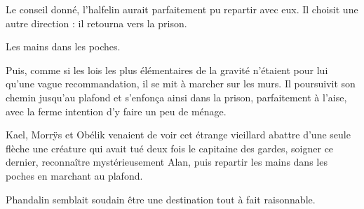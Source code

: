 Le conseil donné, l'halfelin aurait parfaitement pu repartir avec eux. Il choisit une autre direction : il retourna vers la prison.

Les mains dans les poches.

Puis, comme si les lois les plus élémentaires de la gravité n'étaient pour lui qu'une vague recommandation, il se mit à marcher sur les murs. Il poursuivit son chemin jusqu'au plafond et s'enfonça ainsi dans la prison, parfaitement à l'aise, avec la ferme intention d'y faire un peu de ménage.

Kael, Morrÿs et Obélik venaient de voir cet étrange vieillard abattre d'une seule flèche une créature qui avait tué deux fois le capitaine des gardes, soigner ce dernier, reconnaître mystérieusement Alan, puis repartir les mains dans les poches en marchant au plafond.

Phandalin semblait soudain être une destination tout à fait raisonnable.
